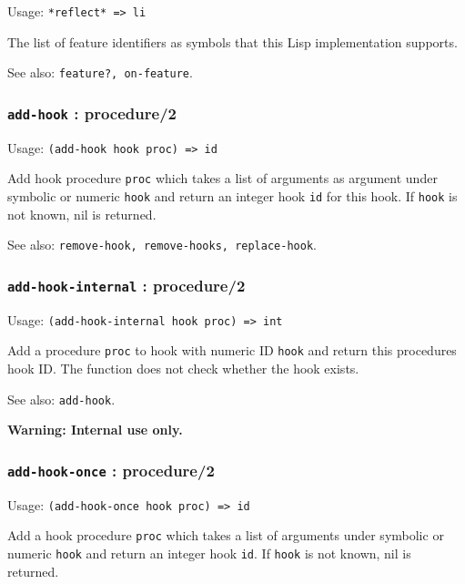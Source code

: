 \documentclass[
]{article}
\newcommand{\passthrough}[1]{#1}
\begin{document}
Usage: \passthrough{\lstinline!*reflect* => li!}

The list of feature identifiers as symbols that this Lisp implementation
supports.

See also: \passthrough{\lstinline!feature?, on-feature!}.

\hypertarget{add-hook-procedure2}{%
\subsubsection{\texorpdfstring{\texttt{add-hook} :
procedure/2}{add-hook : procedure/2}}\label{add-hook-procedure2}}

Usage: \passthrough{\lstinline!(add-hook hook proc) => id!}

Add hook procedure \passthrough{\lstinline!proc!} which takes a list of
arguments as argument under symbolic or numeric
\passthrough{\lstinline!hook!} and return an integer hook
\passthrough{\lstinline!id!} for this hook. If
\passthrough{\lstinline!hook!} is not known, nil is returned.

See also:
\passthrough{\lstinline!remove-hook, remove-hooks, replace-hook!}.

\hypertarget{add-hook-internal-procedure2}{%
\subsubsection{\texorpdfstring{\texttt{add-hook-internal} :
procedure/2}{add-hook-internal : procedure/2}}\label{add-hook-internal-procedure2}}

Usage: \passthrough{\lstinline!(add-hook-internal hook proc) => int!}

Add a procedure \passthrough{\lstinline!proc!} to hook with numeric ID
\passthrough{\lstinline!hook!} and return this procedures hook ID. The
function does not check whether the hook exists.

See also: \passthrough{\lstinline!add-hook!}.

\textbf{Warning: Internal use only.}

\hypertarget{add-hook-once-procedure2}{%
\subsubsection{\texorpdfstring{\texttt{add-hook-once} :
procedure/2}{add-hook-once : procedure/2}}\label{add-hook-once-procedure2}}

Usage: \passthrough{\lstinline!(add-hook-once hook proc) => id!}

Add a hook procedure \passthrough{\lstinline!proc!} which takes a list
of arguments under symbolic or numeric \passthrough{\lstinline!hook!}
and return an integer hook \passthrough{\lstinline!id!}. If
\passthrough{\lstinline!hook!} is not known, nil is returned.
\end{document}
